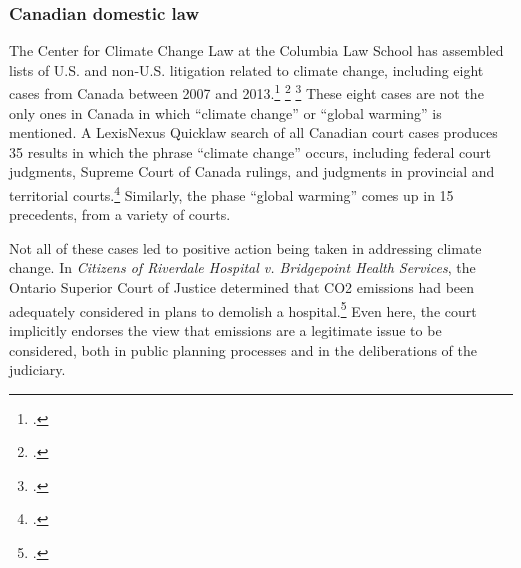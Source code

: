 	\subsubsection{Canadian domestic law}
	\label{sec:CanDomesticLaw}



The Center for Climate Change Law at the Columbia Law School has assembled lists of U.S. and non-U.S. litigation related to climate change, including eight cases from Canada between 2007 and 2013.\footcite[][p. 23]{ColumbiaIntl} \footcite[][]{ColumbiaUS} \footcite[See also: ][]{Gerrard2007}
These eight cases are not the only ones in Canada in which ``climate change'' or ``global warming'' is mentioned.
A LexisNexus Quicklaw search of all Canadian court cases produces 35 results in which the phrase ``climate change'' occurs, including federal court judgments, Supreme Court of Canada rulings, and judgments in provincial and territorial courts.\footcite[For a summary of the history of judicial interpretation of the powers of the federal and provincial governments concerning environmental protection, see Chapter 3 of: ][]{Harrison1996}
Similarly, the phase ``global warming'' comes up in 15 precedents, from a variety of courts.



Not all of these cases led to positive action being taken in addressing climate change.
In \emph{Citizens of Riverdale Hospital v. Bridgepoint Health Services}, the Ontario Superior Court of Justice determined that CO2 emissions had been adequately considered in plans to demolish a hospital.\footcite[][p. 111]{ColumbiaIntl}
Even here, the court implicitly endorses the view that  emissions are a legitimate issue to be considered, both in public planning processes and in the deliberations of the judiciary.



